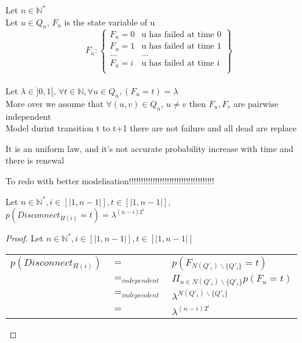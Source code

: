 \begin{definition} Let $n \in \mathbb{N}^{*}$\\
  Let $u \in Q_{n}$, $F_{u}$ is the state variable of u
  $$F_{u} : \left\{ 
  \begin{array}{cc}
   F_{u}=0 & \text{u has failed  at time 0}\\
   F_{u}=1 & \text{u has failed  at time 1}\\
   ... & ...\\
   F_{u}=i & \text{u has failed  at time i}\\
  \end{array}
  \right\}
 $$\\
 Let $\lambda \in ]0,1[$, $\forall t \in \mathbb{N}, \forall u \in Q_{n}, (F_{u}=t) = \lambda$ \\
 More over we assume that $\forall (u,v) \in Q_{n}$, $u \neq v$ then $F_{u}, F_{v}$ are pairwise independent\\
 
 Model durint transition t to t+1 there are not failure and all dead are replace
\end{definition}

\begin{remarque}
  It is an uniform law, and it's not accurate probability increase with time and there is renewal
\end{remarque}

To redo with better modelisation!!!!!!!!!!!!!!!!!!!!!!!!!!!!!!!!!!!!
\begin{prop} 
  Let $n \in \mathbb{N}^{*}, i \in [|1,n-1|], t \in [|1,n-1|]$, $p(Disconnect_{H(i)}=t)= \lambda ^{(n-i)2^{i}}$
\end{prop}

\begin{proof}Let $n \in \mathbb{N}^{*}, i \in [|1,n-1|], t \in [|1,n-1|]$\\
  \begin{tabular}{lll}
    $p(Disconnect_{H(i)})$ & $=$ & $p(F_{N( Q'_{i}) \backslash\lbrace{Q'_{i}}\rbrace}=t)$\\
    & $=_{independent}$ & $\Pi_{u \in N( Q'_{i}) \backslash\lbrace{Q'_{i}}\rbrace}{p(F_{u}=t)}$\\
    & $=_{independent}$ & $\lambda^{ N( Q'_{i}) \backslash\lbrace{Q'_{i}}\rbrace }$\\
    & $=$ & $\lambda^{ (n-i) 2^{i} }$\\
     \end{tabular}
\end{proof}

